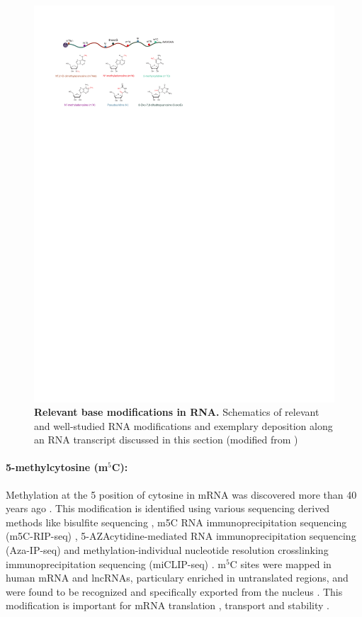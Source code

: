  \begin{figure}
	 \centering
	 \includegraphics[width=1\linewidth]{img/chapter1/base_modifications}
	  \caption[Relevant base modifications in RNA]{\textbf{Relevant base modifications in RNA.} Schematics of relevant and well-studied RNA modifications and exemplary deposition along an RNA transcript discussed in this section (modified from \citeauthor{Li2016} \citep{Li2016})}
	 \label{fig:base_modifications}
\end{figure}
 
 \paragraph{5-methylcytosine (m$^5$C):} Methylation at the 5 position of cytosine in mRNA was discovered more than 40 years ago \citep{Desrosiers1974,Dubin1975}. This modification is identified using various sequencing derived methods like bisulfite sequencing \citep{Schaefer2009}, m5C RNA immunoprecipitation sequencing (m5C-RIP-seq) \citep{Edelheit2013}, 5-AZAcytidine-mediated RNA immunoprecipitation sequencing (Aza-IP-seq) \citep{Khoddami2014} and methylation-individual nucleotide resolution crosslinking immunoprecipitation sequencing (miCLIP-seq) \citep{Hussain2013}. m$^5$C sites were mapped in human mRNA and lncRNAs, particulary enriched in untranslated regions, and were found to be recognized and specifically exported from the nucleus  \citep{Yang2017}. This modification is important for mRNA translation \citep{Cui2017}, transport \citep{Yang2017} and stability \citep{Cui2017,Yang2019}.
 

